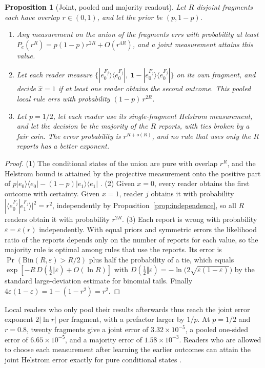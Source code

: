 \documentclass[12pt,a4paper]{article}
\newtheorem{proposition}[theorem]{Proposition}
\begin{document}
\begin{proposition}[Joint, pooled and majority readout]
\label{prop:exponents}
Let $R$ disjoint fragments each have overlap $r\in(0,1)$, and let the prior be $(p,1-p)$.
\begin{enumerate}
\item Any measurement on the union of the fragments errs with probability at least $P_e(r^R)=p(1-p)r^{2R}+O(r^{4R})$, and a joint measurement attains this value.
\item Let each reader measure $\{|e_0^{F_j}\rangle\langle e_0^{F_j}|,\ \mathbf 1-|e_0^{F_j}\rangle\langle e_0^{F_j}|\}$ on its own fragment, and decide $\hat x=1$ if at least one reader obtains the second outcome. This pooled local rule errs with probability $(1-p)\,r^{2R}$.
\item Let $p=1/2$, let each reader use its single-fragment Helstrom measurement, and let the decision be the majority of the $R$ reports, with ties broken by a fair coin. The error probability is $r^{R+o(R)}$, and no rule that uses only the $R$ reports has a better exponent.
\end{enumerate}
\end{proposition}

\begin{proof}
(1) The conditional states of the union are pure with overlap $r^R$, and the Helstrom bound is attained by the projective measurement onto the positive part of $p|e_0\rangle\langle e_0|-(1-p)|e_1\rangle\langle e_1|$ \cite{Helstrom1976}. (2) Given $x=0$, every reader obtains the first outcome with certainty. Given $x=1$, reader $j$ obtains it with probability $|\langle e_0^{F_j}|e_1^{F_j}\rangle|^2=r^2$, independently by Proposition~\ref{prop:independence}, so all $R$ readers obtain it with probability $r^{2R}$. (3) Each report is wrong with probability $\varepsilon=\varepsilon(r)$ independently. With equal priors and symmetric errors the likelihood ratio of the reports depends only on the number of reports for each value, so the majority rule is optimal among rules that use the reports. Its error is $\Pr(\mathrm{Bin}(R,\varepsilon)>R/2)$ plus half the probability of a tie, which equals $\exp[-R\,D(\tfrac12\Vert\varepsilon)+O(\ln R)]$ with $D(\tfrac12\Vert\varepsilon)=-\ln\bigl(2\sqrt{\varepsilon(1-\varepsilon)}\bigr)$ by the standard large-deviation estimate for binomial tails. Finally $4\varepsilon(1-\varepsilon)=1-(1-r^2)=r^2$.
\end{proof}

Local readers who only pool their results afterwards thus reach the joint error exponent $2|\ln r|$ per fragment, with a prefactor larger by $1/p$. At $p=1/2$ and $r=0.8$, twenty fragments give a joint error of $3.32\times10^{-5}$, a pooled one-sided error of $6.65\times10^{-5}$, and a majority error of $1.58\times10^{-3}$. Readers who are allowed to choose each measurement after learning the earlier outcomes can attain the joint Helstrom error exactly for pure conditional states \cite{BrodyMeister1996}.
\end{document}
